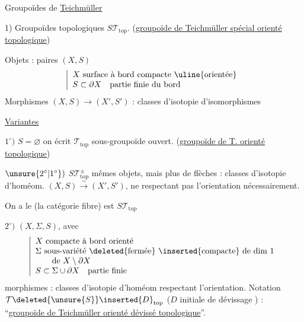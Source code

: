 Groupoïdes de \uline{Teichmüller}

1) Groupoïdes topologiques $\boxed{S\mathcal T_{\mathrm{top}}}$.
(\uline{groupoïde de Teichmüller spécial orienté topologique})

Objets : paires $(X,S)$
\[
\left|\begin{array}{l}
X\ \text{surface à bord compacte \uline{orientée}}\\
S\subset\partial X\quad\text{partie finie du bord}
\end{array}\right.
\]
Morphismes $(X,S)\longrightarrow(X',S')$ : classes d'isotopie d'isomorphismes

 \uline{Variantes}

$1^\circ)$ $S=\varnothing$ on écrit $\mathcal T_{\mathrm{top}}$ sous-groupoïde ouvert.
(\uline{groupoïde de T.  orienté topologique})

$\unsure{2^\circ|1^\circ})$ $\boxed{S\mathcal T_{\mathrm{top}}^\pm}$ mêmes objets, mais plus de flèches :
classes d'isotopie d'homéom. $(X,S)\xrightarrow{\sim}(X',S')$, ne respectant pas l'orientation nécessairement.

On a
le   (la catégorie fibre) est $S\mathcal T_{\mathrm{top}}$

$2^\circ)$ $(X,\Sigma,S)$, avec
\[
\left|\begin{array}{l}
X\ \text{compacte à bord orienté}\\
\Sigma\ \text{sous-variété \deleted{fermée} \inserted{compacte} de dim $1$}\\
\qquad\text{de }X\setminus\partial X\\
S\subset\Sigma\cup\partial X\quad\text{partie finie}
\end{array}\right.
\]
morphismes : classes d'isotopie d'homéom respectant l'orientation.
Notation $\mathcal T\deleted{\unsure{S}}\inserted{D}_{\mathrm{top}}$
($D$ initiale de dévissage ) :
``\uline{groupoïde de Teichmüller orienté dévissé topologique}''.

